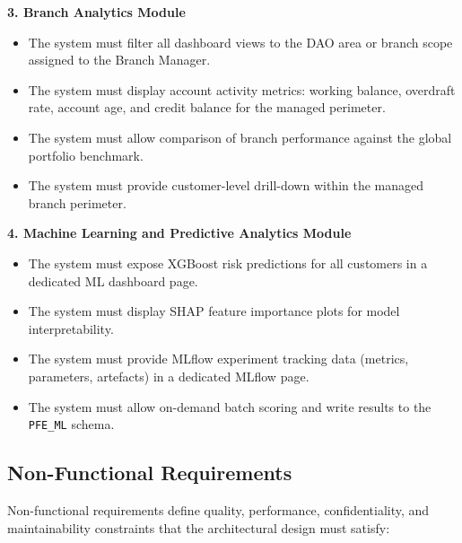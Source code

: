 \textbf{3. Branch Analytics Module}
\begin{itemize}
    \item The system must filter all dashboard views to the DAO area or branch scope
    assigned to the Branch Manager.
    \item The system must display account activity metrics: working balance, overdraft rate,
    account age, and credit balance for the managed perimeter.
    \item The system must allow comparison of branch performance against the global
    portfolio benchmark.
    \item The system must provide customer-level drill-down within the managed branch perimeter.
\end{itemize}

\textbf{4. Machine Learning and Predictive Analytics Module}
\begin{itemize}
    \item The system must expose XGBoost risk predictions for all customers in a dedicated
    ML dashboard page.
    \item The system must display SHAP feature importance plots for model interpretability.
    \item The system must provide MLflow experiment tracking data (metrics, parameters,
    artefacts) in a dedicated MLflow page.
    \item The system must allow on-demand batch scoring and write results to the
    \texttt{PFE\_ML} schema.
\end{itemize}

\subsection{Non-Functional Requirements}

Non-functional requirements define quality, performance, confidentiality, and maintainability
constraints that the architectural design must satisfy:

